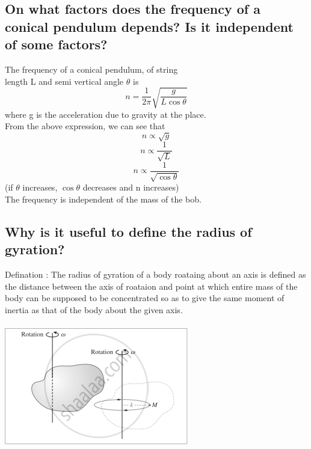 \documentclass{article}
\begin{document}
   \subsection{On what factors does the frequency of a conical
   pendulum depends? Is it independent of some factors?}
   The frequency of a conical pendulum, of string \\
   length L and semi vertical angle $\theta$ is 
   \begin{equation}
	   n = \frac{1}{2\pi} \sqrt{\frac{g}{L \cos \theta}}
   \end{equation}
   where g is the acceleration due to gravity at the place. \\
   From the above expression, we can see that
   \begin{equation}
	   n \propto \sqrt{g}
   \end{equation}
   \begin{equation}
	   n \propto \frac{1}{\sqrt{L}}
   \end{equation}
   \begin{equation}
	   n \propto \frac{1}{\sqrt{\cos \theta}}
   \end{equation}
   (if $\theta$ increases, $\cos \theta$ decreases and n
   increases) \\
   The frequency is independent of the mass of the bob.

   \subsection{Why is it useful to define the radius of 
   gyration?}
   Defination : The radius of gyration of a body roataing 
   about an axis is defined as the distance between the axis of
   roataion and point at which entire mass of the body can be 
   supposed to be concentrated so as to give the same moment of
   inertia as that of the body about the given axis. \\\\
   \includegraphics[scale=0.5]{gyration}
\end{document}
